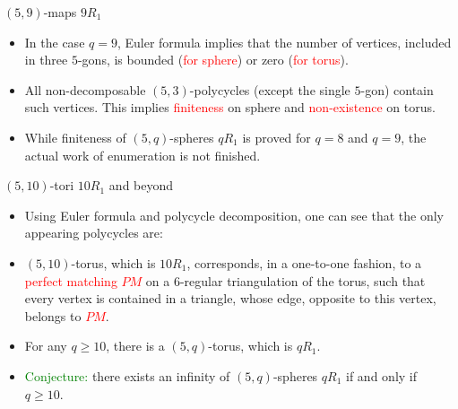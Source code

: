 \documentclass[%
pdf,
colorBG,
slideColor,
]{prosper}
\begin{document}
\begin{slide}{$(5,9)$-maps $9R_1$}
\begin{itemize}
\item In the case $q=9$, Euler formula implies that the number of 
vertices, included in three $5$-gons, is bounded 
(\textcolor{red}{for sphere}) or zero (\textcolor{red}{for torus}).
\item All non-decomposable $(5,3)$-polycycles (except the single 
$5$-gon) contain such vertices. 
This implies \textcolor{red}{finiteness} on sphere and \textcolor{red}{non-existence} on torus.
\item While finiteness of $(5,q)$-spheres $qR_1$ is proved for $q=8$ and 
$q=9$, the actual work of enumeration is not finished.
\end{itemize}
\end{slide}




\begin{slide}{$(5,10)$-tori $10R_1$ and beyond}

\begin{itemize}
\item Using Euler formula and polycycle decomposition, 
one can see that the only appearing polycycles are:
\begin{center}
\begin{minipage}{3.4cm}
\centering
{}\par
\end{minipage}
\begin{minipage}{3.4cm}
\centering
{}\par
\end{minipage}
\end{center}
\item $(5,10)$-torus, which is $10R_1$, corresponds, in a one-to-one fashion, to a \textcolor{red}{perfect matching} \textcolor{red}{$PM$} on a $6$-regular triangulation of the torus, such that every vertex is contained in a triangle,
whose edge, opposite to this vertex, belongs to \textcolor{red}{$PM$}.
\item For any $q\geq 10$, there is a $(5,q)$-torus, which is $qR_1$.
\item \textcolor{green}{Conjecture:} there exists an infinity of $(5,q)$-spheres $qR_1$ if and only if $q\geq 10$.
\end{itemize}

\end{slide}
\end{document}
